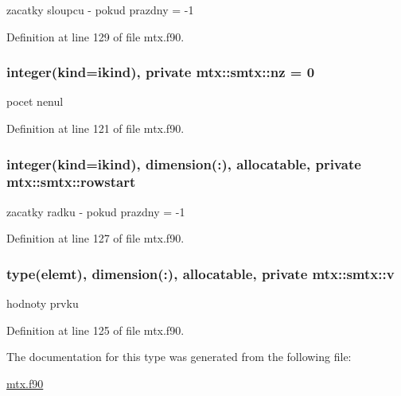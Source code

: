 zacatky sloupcu -\/ pokud prazdny = -\/1 



\-Definition at line 129 of file mtx.\-f90.

\hypertarget{structmtx_1_1smtx_afa772e98ed5d92de7af52fa3fd90ab02}{
\subsubsection[{nz}]{\setlength{\rightskip}{0pt plus 5cm}integer(kind=ikind), private {\bf mtx\-::smtx\-::nz} = 0}}\label{structmtx_1_1smtx_afa772e98ed5d92de7af52fa3fd90ab02}


pocet nenul 



\-Definition at line 121 of file mtx.\-f90.

\hypertarget{structmtx_1_1smtx_a363f8a38834bc21f7db7a79f171e72d0}{
\subsubsection[{rowstart}]{\setlength{\rightskip}{0pt plus 5cm}integer(kind=ikind), dimension(\-:), allocatable, private {\bf mtx\-::smtx\-::rowstart}}}\label{structmtx_1_1smtx_a363f8a38834bc21f7db7a79f171e72d0}


zacatky radku -\/ pokud prazdny = -\/1 



\-Definition at line 127 of file mtx.\-f90.

\hypertarget{structmtx_1_1smtx_aefb573912d9722d432a04e74fad75ba9}{
\subsubsection[{v}]{\setlength{\rightskip}{0pt plus 5cm}type({\bf elemt}), dimension(\-:), allocatable, private {\bf mtx\-::smtx\-::v}}}\label{structmtx_1_1smtx_aefb573912d9722d432a04e74fad75ba9}


hodnoty prvku 



\-Definition at line 125 of file mtx.\-f90.



\-The documentation for this type was generated from the following file\-:\begin{DoxyCompactItemize}
\item 
\hyperlink{mtx_8f90}{mtx.\-f90}\end{DoxyCompactItemize}
